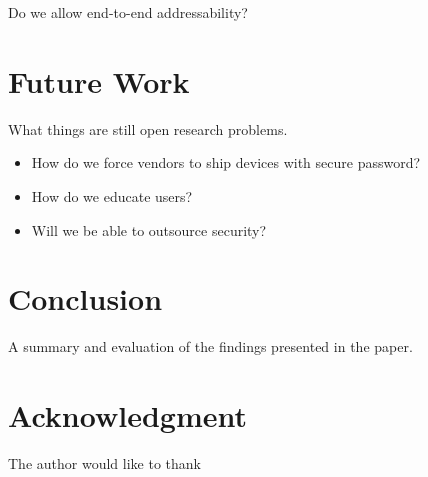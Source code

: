 \documentclass[10pt,journal,compsoc]{IEEEtran}
\begin{document}
Do we allow end-to-end addressability?

\section{Future Work}
What things are still open research problems. 

\begin{itemize}
\item How do we force vendors to ship devices with secure password?
\item How do we educate users?
\item Will we be able to outsource security?
\end{itemize}


\section{Conclusion}
A summary and evaluation of the findings presented in the paper.



\section*{Acknowledgment}
The author would like to thank 


\end{document}
